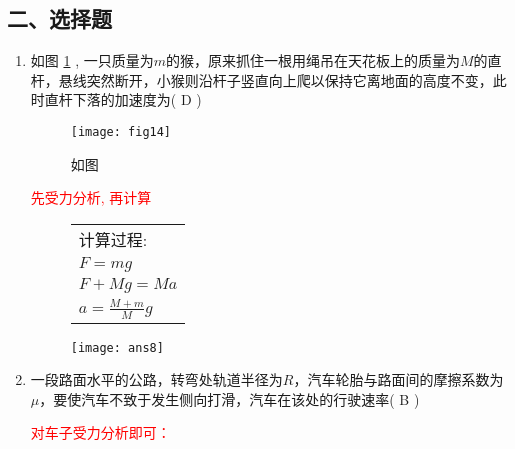 \subsection*{二、选择题}
\begin{enumerate}
    \item  如图 \ref{Fig:14} , 一只质量为$m$的猴，原来抓住一根用绳吊在天花板上的质量为$M$的直杆，悬线突然断开，小猴则沿杆子竖直向上爬以保持它离地面的高度不变，此时直杆下落的加速度为( D )
    \begin{figure}[H]
        \centering
        \texttt{[image: fig14]}
            \caption{如图}\label{Fig:14}
    \end{figure}

    \begin{note}
        \textcolor{red}{先受力分析, 再计算}
        \begin{figure}[H]
            \begin{minipage}[ht]{0.6\linewidth}
                \begin{table}[H]
                    \begin{tabular}{l}
                       \qquad 计算过程:\\
                       \qquad \qquad $F=mg$ \\
                        \qquad \qquad   $F+Mg = Ma$ \\
                        \qquad \qquad $a = \frac{M+m}{M}g$\\ 
                    \end{tabular}
                \end{table}  
            \end{minipage}
            \begin{minipage}[h]{0.3\linewidth}
                \texttt{[image: ans8]}
            \end{minipage}
        \end{figure}
    \end{note}
    \item 一段路面水平的公路，转弯处轨道半径为$R$，汽车轮胎与路面间的摩擦系数为$\mu$，要使汽车不致于发生侧向打滑，汽车在该处的行驶速率( B )
    \begin{note}
        \textcolor{red}{对车子受力分析即可：}
        \begin{figure}[H]

\end{figure}
\end{note}
\end{enumerate}
